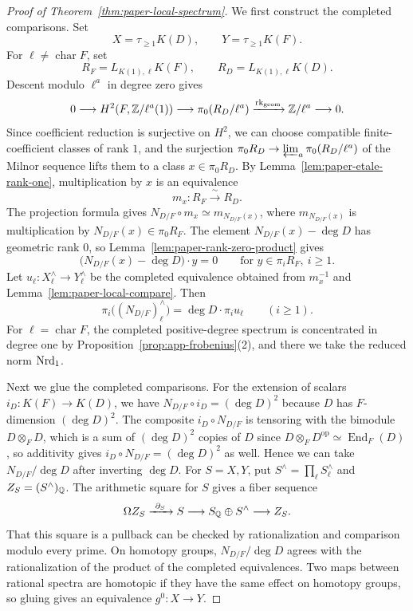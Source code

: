 \begin{proof}[Proof of Theorem~\ref{thm:paper-local-spectrum}]
We first construct the completed comparisons.
Set
\[
 X=\tau_{\ge1}K(D),\qquad Y=\tau_{\ge1}K(F).
\]
For $\ell\ne\operatorname{char}F$, set
\[
 R_F=L_{K(1),\ell}K(F),\qquad R_D=L_{K(1),\ell}K(D).
\]
Descent modulo $\ell^a$ in degree zero gives
\[
 0\longrightarrow H^2(F,\mathbb Z/\ell^a(1))\longrightarrow
 \pi_0(R_D/\ell^a)\xrightarrow{\mathrm{rk}_{\mathrm{geom}}}\mathbb Z/\ell^a\longrightarrow0.
\]
Since coefficient reduction is surjective on $H^2$, we can choose compatible finite-coefficient classes of rank $1$, and the surjection $\pi_0R_D\to\varprojlim_a\pi_0(R_D/\ell^a)$ of the Milnor sequence lifts them to a class $x\in\pi_0R_D$.
By Lemma~\ref{lem:paper-etale-rank-one}, multiplication by $x$ is an equivalence
\[
 m_x\colon R_F\xrightarrow{\ \sim\ }R_D.
\]
The projection formula gives $N_{D/F}\circ m_x\simeq m_{N_{D/F}(x)}$, where $m_{N_{D/F}(x)}$ is multiplication by $N_{D/F}(x)\in\pi_0R_F$.
The element $N_{D/F}(x)-\deg D$ has geometric rank $0$, so Lemma~\ref{lem:paper-rank-zero-product} gives
\[
 \bigl(N_{D/F}(x)-\deg D\bigr)\cdot y=0\qquad\text{for }y\in\pi_iR_F,\ i\ge1.
\]
Let $u_\ell\colon X^\wedge_\ell\to Y^\wedge_\ell$ be the completed equivalence obtained from $m_x^{-1}$ and Lemma~\ref{lem:paper-local-compare}.
Then
\[
 \pi_i\bigl((N_{D/F})^\wedge_\ell\bigr)=\deg D\cdot\pi_iu_\ell\qquad(i\ge1).
\]
For $\ell=\operatorname{char}F$, the completed positive-degree spectrum is concentrated in degree one by Proposition~\ref{prop:app-frobenius}(2), and there we take the reduced norm $\operatorname{Nrd}_1$.

Next we glue the completed comparisons.
For the extension of scalars $i_D\colon K(F)\to K(D)$, we have $N_{D/F}\circ i_D=(\deg D)^2$ because $D$ has $F$-dimension $(\deg D)^2$.
The composite $i_D\circ N_{D/F}$ is tensoring with the bimodule $D\otimes_FD$, which is a sum of $(\deg D)^2$ copies of $D$ since $D\otimes_FD^{\mathrm{op}}\simeq\operatorname{End}_F(D)$, so additivity gives $i_D\circ N_{D/F}=(\deg D)^2$ as well.
Hence we can take $N_{D/F}/\deg D$ after inverting $\deg D$.
For $S=X,Y$, put $S^\wedge=\prod_\ell S^\wedge_\ell$ and $Z_S=(S^\wedge)_{\mathbb Q}$.
The arithmetic square for $S$ gives a fiber sequence
\[
 \Omega Z_S\xrightarrow{\ \partial_S\ }S\longrightarrow S_{\mathbb Q}\oplus S^\wedge
 \longrightarrow Z_S.
\]
That this square is a pullback can be checked by rationalization and comparison modulo every prime.
On homotopy groups, $N_{D/F}/\deg D$ agrees with the rationalization of the product of the completed equivalences.
Two maps between rational spectra are homotopic if they have the same effect on homotopy groups, so gluing gives an equivalence $g^0\colon X\to Y$.


\end{proof}
